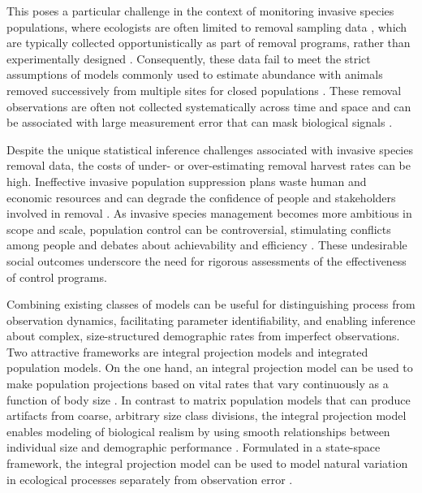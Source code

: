 \documentclass{article}
\begin{document}
This poses a particular challenge in the context of monitoring invasive species populations, where ecologists are often limited to removal sampling data \parencite{udell2022open}, which are typically collected opportunistically as part of removal programs, rather than experimentally designed \parencite{tiberti2021alien, crall2010improving, rogosch2021comparing}. Consequently, these data fail to meet the strict assumptions of models commonly used to estimate abundance with animals removed successively from multiple sites for closed populations \parencite{dorazio2005improving}. These removal observations are often not collected systematically across time and space and can be associated with large measurement error that can mask biological signals \parencite{auger2016state, sibert2003horizontal, katsanevakis2012monitoring}.

Despite the unique statistical inference challenges associated with invasive species removal data, the costs of under- or over-estimating removal harvest rates can be high. Ineffective invasive population suppression plans waste human and economic resources and can degrade the confidence of people and stakeholders involved in removal \parencite{tiberti2021alien}. As invasive species management becomes more ambitious in scope and scale, population control can be controversial, stimulating conflicts among people and debates about achievability and efficiency \parencite{crowley2017conflict}. These undesirable social outcomes underscore the need for rigorous assessments of the effectiveness of control programs.

Combining existing classes of models can be useful for distinguishing process from observation dynamics, facilitating parameter identifiability, and enabling inference about complex, size-structured demographic rates from imperfect observations. Two attractive frameworks are integral projection models and integrated population models. On the one hand, an integral projection model can be used to make population projections based on vital rates that vary continuously as a function of body size \parencite{merow2014advancing, rees2014building}. In contrast to matrix population models that can produce artifacts from coarse, arbitrary size class divisions, the integral projection model enables modeling of biological realism by using smooth relationships between individual size and demographic performance \parencite{ellner2006integral}. Formulated in a state-space framework, the integral projection model can be used to model natural variation in ecological processes separately from observation error \parencite{auger2021guide, white2016fitting}. 
\end{document}
